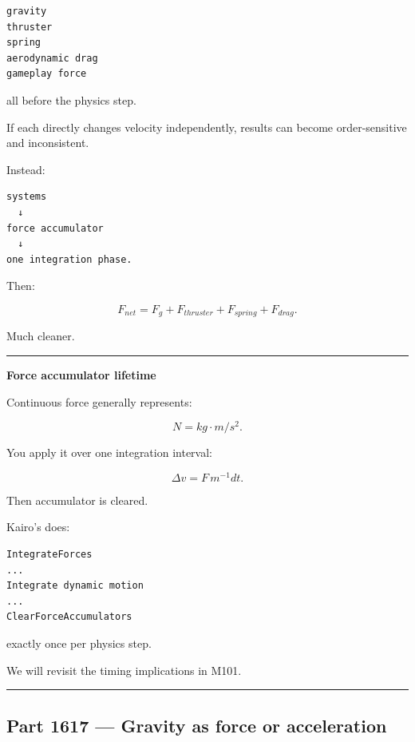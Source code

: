 \begin{verbatim}
gravity
thruster
spring
aerodynamic drag
gameplay force
\end{verbatim}

all before the physics step.

If each directly changes velocity independently, results can become order-sensitive and inconsistent.

Instead:

\begin{verbatim}
systems
  ↓
force accumulator
  ↓
one integration phase.
\end{verbatim}

Then:

\[
F_{net}
=
F_g+
F_{thruster}+
F_{spring}+
F_{drag}.
\]

Much cleaner.

\begin{center}\rule{0.5\linewidth}{0.5pt}\end{center}

\textbf{Force accumulator lifetime}

Continuous force generally represents:

\[
N=kg\cdot m/s^2.
\]

You apply it over one integration interval:

\[
\Delta v=
F\,m^{-1}dt.
\]

Then accumulator is cleared.

Kairo's  does:

\begin{verbatim}
IntegrateForces
...
Integrate dynamic motion
...
ClearForceAccumulators
\end{verbatim}

exactly once per physics step.

We will revisit the timing implications in M101.

\begin{center}\rule{0.5\linewidth}{0.5pt}\end{center}

\subsection{Part 1617 --- Gravity as force or acceleration}\label{06-engine-ii-ch034-part-1617-gravity-as-force-or-acceleration}

\hypertarget{06-engine-ii-ch034-part-1617-gravity-as-force-or-acceleration}{}

